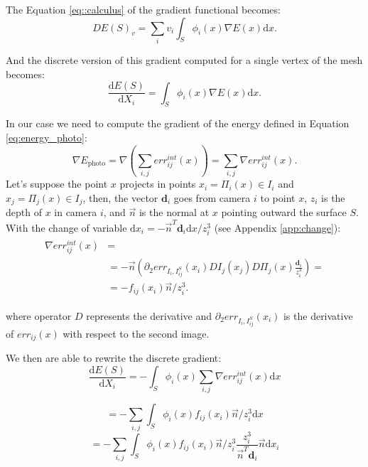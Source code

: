 The Equation \eqref{eq::calculus} of the gradient functional becomes:
\begin{equation}
  DE(\mathit{S})_v = \sum_i v_i \int_{\mathit{S}} \phi_i(x) \nabla E(x) \textrm{d}x.
\end{equation}

And the discrete version of this gradient computed for a single vertex of the mesh becomes:
\begin{equation}
  \frac{\textrm{d}E(\mathit{S})}{\textrm{d}X_i} =  \int_{\mathit{S}} \phi_i(x) \nabla E(x) \textrm{d}x.
\end{equation}

In our case we need to compute the gradient of the energy defined in Equation \eqref{eq:energy_photo}:
\begin{equation}
  \nabla E_{\textrm{photo}} = \nabla (\sum_{i,j} err^{int}_{ij}(x)) = \sum_{i,j} \nabla err^{int}_{ij}(x).
\end{equation}
Let's suppose the point $x$ projects in points $x_i = \Pi_i(x) \in I_i$ and  $x_j = \Pi_j(x) \in I_j$, then, the vector $\mathbf{d}_i$ goes from camera $i$ to point $x$, $z_i$ is the depth of $x$ in camera $i$, and $\overrightarrow{n}$ is the normal at $x$ pointing outward the surface $\mathit{S}$. 
With the change of variable $\textrm{d}x_i = -\overrightarrow{n}^T \mathbf{d}_i \textrm{d}x/z_i^3$ (see Appendix \ref{app:change}):
\begin{align}
 \begin{split}
  \nabla err^{int}_{ij}(x)& = \\
  &=-\overrightarrow{n} \left( \partial_2 err_{I_i, I_{ij}^{\mathit{S}}}(x_i) DI_j(x_j) D\Pi_j(x)\frac{\mathbf{d}_i}{z_i^3}\right)=\\
  &= - f_{ij}(x_i) \overrightarrow{n}/z_i^3.
 \end{split}
\end{align}
    
where operator $D$ represents the derivative and $\partial_2 err_{I_i, I_{ij}^{\mathit{S}}}(x_i)$ is the derivative of $err_{ij}(x)$ with respect to the second image.


We then are able to rewrite the discrete gradient:
\begin{equation}
  \frac{\textrm{d}E(\mathit{S})}{\textrm{d}X_i} =  - \int_{\mathit{S}} \phi_i(x) \sum_{i,j} \nabla err^{int}_{ij}(x) \textrm{d}x 
\end{equation}

\begin{equation}
  =  - \sum_{i,j} \int_{\mathit{S}} \phi_i(x)  f_{ij}(x_i)  \overrightarrow{n}/z_i^3 \textrm{d}x 
\end{equation}
\begin{equation}
\label{eq:final}
  =  - \sum_{i,j} \int_{\mathit{S}} \phi_i(x)  f_{ij}(x_i)  \overrightarrow{n}/z_i^3 \frac{z_i^3}{\overrightarrow{n}^T \mathbf{d}_i }\overrightarrow{n} \textrm{d}x_i
\end{equation}
% 

